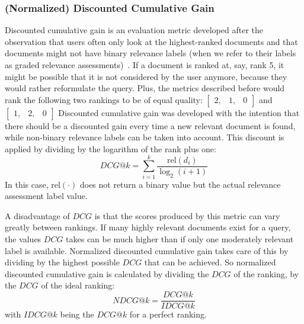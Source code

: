 \subsubsection{(Normalized) Discounted Cumulative Gain}
Discounted cumulative gain is an evaluation metric developed after the observation that users often only look at the highest-ranked documents and that documents might not have binary relevance labels (when we refer to their labels as graded relevance assessments)~\citep{ndcg}.
If a document is ranked at, say, rank 5, it might be possible that it is not considered by the user anymore, because they would rather reformulate the query. Plus, the metrics described before would rank the following two rankings to be of equal quality: 
$\left[
\begin{smallmatrix}
	2, & 1, & 0
\end{smallmatrix}
\right]$ and $\left[
\begin{smallmatrix}
	1, & 2, & 0
\end{smallmatrix}
\right]$
Discounted cumulative gain was developed with the intention that there should be a discounted gain every time a new relevant document is found, while non-binary relevance labels can be taken into account. This discount is applied by dividing by the logarithm of the rank plus one: 
\begin{equation}
	\textit{DCG}@k = \sum^k_{i=1} \frac{\text{rel}(d_i)}{\log_2(i+1)}
\end{equation}
In this case, $\text{rel}(\cdot)$ does not return a binary value but the actual relevance assessment label value.

A disadvantage of $\textit{DCG}$ is that the scores produced by this metric can vary greatly between rankings. If many highly relevant documents exist for a query, the values $\textit{DCG}$ takes can be much higher than if only one moderately relevant label is available. Normalized discounted cumulative gain takes care of this by dividing by the highest possible $\textit{DCG}$ that can be achieved. So normalized discounted cumulative gain is calculated by dividing the $\textit{DCG}$ of the ranking, by the $\textit{DCG}$ of the ideal ranking:  
\begin{equation}
	\textit{NDCG}@k = \frac{\textit{DCG}@k}{\textit{IDCG}@k} 
\end{equation}
with $\textit{IDCG}@k$ being the $\textit{DCG}@k$ for a perfect ranking. 

